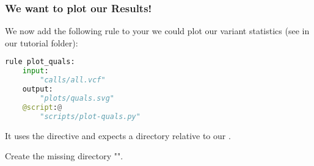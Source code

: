 \begin{frame}[fragile]
  \frametitle{We want to plot our Results!}
  We now add the following rule to your  we could plot our variant statistics (see  in our tutorial folder):
  \begin{lstlisting}[language=Python,style=Python]
rule plot_quals:
    input:
        "calls/all.vcf"
    output:
        "plots/quals.svg"
    @script:@
        "scripts/plot-quals.py"
  \end{lstlisting}
  It uses the  directive and expects a directory  relative to our .
  \pause
  \begin{task}
  	Create the missing directory "".
  \end{task}
\end{frame}

